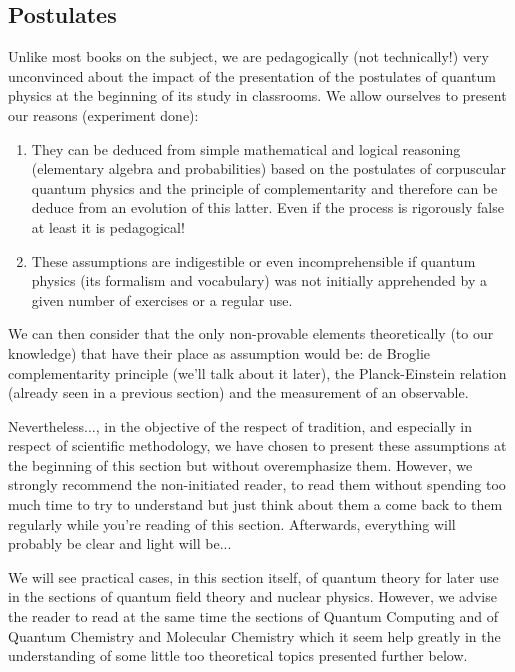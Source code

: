	\pagebreak
	\subsection{Postulates}
	Unlike most books on the subject, we are pedagogically (not technically!) very unconvinced about the impact of the presentation of the postulates of quantum physics at the beginning of its study in classrooms. We allow ourselves to present our reasons (experiment done):
	
	\begin{enumerate}
		\item They can be deduced from simple mathematical and logical reasoning (elementary algebra and probabilities) based on the postulates of corpuscular quantum physics and the principle of complementarity and therefore can be deduce from an evolution of this latter. Even if the process is rigorously false at least it is pedagogical!
		\item These assumptions are indigestible or even incomprehensible if quantum physics (its formalism and vocabulary) was not initially apprehended by a given number of exercises or a regular use.
	\end{enumerate}
	We can then consider that the only non-provable elements theoretically (to our knowledge) that have their place as assumption would be: de Broglie complementarity principle (we'll talk about it later), the Planck-Einstein relation (already seen in a previous section) and the measurement of an observable.
	
	Nevertheless..., in the objective of the respect of tradition, and especially in respect of scientific methodology, we have chosen to present these assumptions at the beginning of this section but without overemphasize them. However, we strongly recommend the non-initiated reader, to read them without spending too much time to try to understand but just think about them a come back to them regularly while you're reading of this section. Afterwards, everything will probably be clear and light will be...

	
	\begin{tcolorbox}[title=Remark,colframe=black,arc=10pt]
	We will see practical cases, in this section itself, of quantum theory for later use in the sections of quantum field theory and nuclear physics. However, we advise the reader to read at the same time the sections of Quantum Computing and of Quantum Chemistry and Molecular Chemistry which it seem help greatly in the understanding of some little too theoretical topics presented further below.
	\end{tcolorbox}
	
